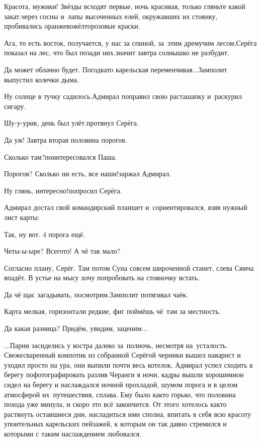 \diagdash Красота, мужики! Звёзды всходят первые, ночь красивая, только гляньте какой закат.\mdash через сосны и~лапы высоченных елей, окружавших их стоянку, пробивались оранжево\sdash жёлто\sdash розовые краски.

\diagdash Ага, то есть восток, получается, у нас за спиной, за~этим дремучим лесом,\mdash Серёга показал на лес, что был позади них.\mdash значит завтра солнышко не разбудит. 

\diagdash Да может облачно будет. Погодка\sdash то карельская переменчивая$\ldots$\mdash Замполит выпустил колечки дыма.

\diagdash Ну солнце в тучку садилось.\mdash Адмирал поправил свою раста\sdash шапку и~раскурил сигару. 

\diagdash Шу-у-урик, день был улёт.\mdash протянул Серёга.

\diagdash Да уж! Завтра вторая половина порогов.

\diagdash Сколько там?\mdash поинтересовался Паша.

\diagdash Порогов? Сколько ни есть, все наши!\mdash заржал Адмирал.

\diagdash Ну глянь, интересно!\mdash попросил Серёга.

Адмирал достал свой командирский планшет и~сориентировался, взяв нужный лист карты:

\diagdash Так, ну вот. 4 порога ещё.

\diagdash Четы-ы-ыре? Всего\sdash то! А чё так мало?

\diagdash Согласно плану, Серёг. Там потом Суна совсем широченной станет, слева Сямча впадёт. В устье на мысу хочу попробовать на стояночку встать.

\diagdash Да чё щас загадывать, посмотрим.\mdash Замполит потягивал чаёк.

\diagdash Карта мелкая, горизонтали редкие, фиг поймёшь чё~там за местность.

\diagdash Да какая разница? Придём, увидим, заценим$\ldots$

\vspace{0.5cm}
$\ldots$Парни засиделись у костра далеко за~полночь, несмотря на~усталость. Свежесваренный компотик из собранной Серёгой черники вышел наварист и уходил просто на ура, они выпили почти весь котелок. Адмирал успел сходить к берегу пофотографировать разлив Черанги в ночи, кадры вышли хорошими\mdash он сидел на берегу и наслаждался ночной прохладой, шумом порога и в целом атмосферой их~путешествия, сплава. Ему было как\sdash то горько, что половина похода уже минула, и скоро это всё закончится. От этого хотелось как\sdash то растянуть оставшиеся дни, насладиться ими сполна, впитать в себя всю красоту упоительных карельских пейзажей, к которым он так давно стремился и которыми с таким наслаждением любовался.

\begin{center}
\end{center}
